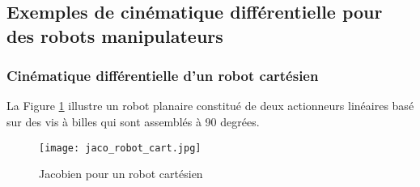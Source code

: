 \newpage
\subsection{Exemples de cinématique différentielle pour des robots manipulateurs}

\subsubsection{Cinématique différentielle d'un robot cartésien}

La Figure \ref{fig:jaco_robot_cart} illustre un robot planaire constitué de deux actionneurs linéaires basé sur des vis à billes qui sont assemblés à 90 degrées. 
\begin{figure}[H]
	\vspace{-5pt}
	\centering
		\texttt{[image: jaco\_robot\_cart.jpg]}
	\caption{Jacobien pour un robot cartésien}
	\vspace{-5pt}
	\label{fig:jaco_robot_cart}
\end{figure}

